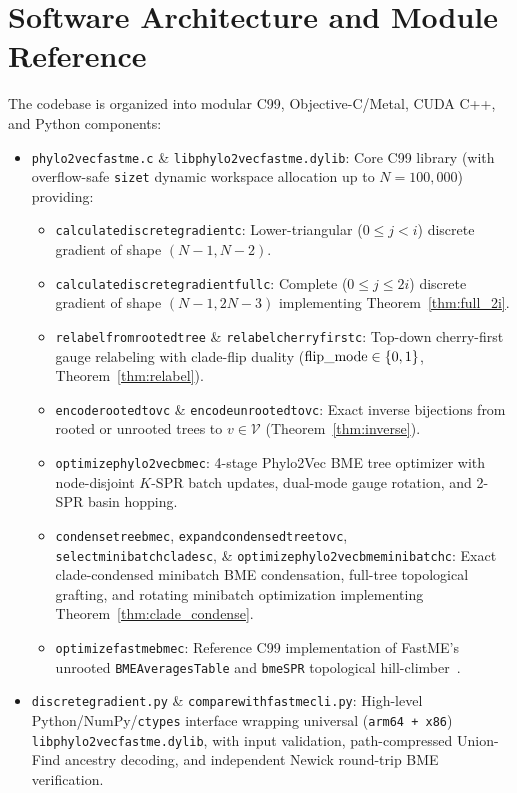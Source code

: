 \documentclass[11pt,a4paper]{article}
\makeatletter
\DeclareRobustCommand{\_}{\ifmmode\nfss@text{\textunderscore}\else\textunderscore\allowbreak\fi}
\theoremstyle{definition}
\makeatother
\begin{document}
\section{Software Architecture and Module Reference}
\label{sec:software}

The codebase is organized into modular C99, Objective-C/Metal, CUDA C++, and Python components:
\begin{itemize}
    \item \texttt{phylo2vec\_fastme.c} \& \texttt{libphylo2vec\_fastme.dylib}: Core C99 library (with overflow-safe \texttt{size\_t} dynamic workspace allocation up to $N = 100{,}000$) providing:
    \begin{itemize}
        \item \texttt{calculate\_discrete\_gradient\_c}: Lower-triangular ($0 \le j < i$) discrete gradient of shape $(N-1, N-2)$.
        \item \texttt{calculate\_discrete\_gradient\_full\_c}: Complete ($0 \le j \le 2i$) discrete gradient of shape $(N-1, 2N-3)$ implementing Theorem~\ref{thm:full_2i}.
        \item \texttt{relabel\_from\_rooted\_tree} \& \texttt{relabel\_cherry\_first\_c}: Top-down cherry-first gauge relabeling with clade-flip duality ($\text{flip\_mode} \in \{0, 1\}$, Theorem~\ref{thm:relabel}).
        \item \texttt{encode\_rooted\_to\_v\_c} \& \texttt{encode\_unrooted\_to\_v\_c}: Exact inverse bijections from rooted or unrooted trees to $v \in \mathcal{V}$ (Theorem~\ref{thm:inverse}).
        \item \texttt{optimize\_phylo2vec\_bme\_c}: 4-stage Phylo2Vec BME tree optimizer with node-disjoint $K$-SPR batch updates, dual-mode gauge rotation, and 2-SPR basin hopping.
        \item \texttt{condense\_tree\_bme\_c}, \texttt{expand\_condensed\_tree\_to\_v\_c}, \texttt{select\_minibatch\_clades\_c}, \& \texttt{optimize\_phylo2vec\_bme\_minibatch\_c}: Exact clade-condensed minibatch BME condensation, full-tree topological grafting, and rotating minibatch optimization implementing Theorem~\ref{thm:clade_condense}.
        \item \texttt{optimize\_fastme\_bme\_c}: Reference C99 implementation of FastME's unrooted \texttt{BMEAveragesTable} and \texttt{bmeSPR} topological hill-climber~\cite{desper2002fast,lefort2015fastme}.
    \end{itemize}
    \item \texttt{discrete\_gradient.py} \& \texttt{compare\_with\_fastme\_cli.py}: High-level Python/NumPy/\texttt{ctypes} interface wrapping universal (\texttt{arm64 + x86\_64}) \texttt{libphylo2vec\_fastme.dylib}, with input validation, path-compressed Union-Find ancestry decoding, and independent Newick round-trip BME verification.

\end{itemize}
\end{document}
